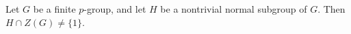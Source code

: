 \documentclass[12pt]{article}
\begin{document}
Let $G$ be a finite $p$-group, and let $H$ be a nontrivial normal subgroup of $G$. Then $H\cap Z(G) \neq \{1\}$.
\end{document}
